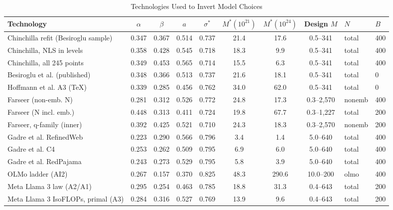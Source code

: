\begin{table}[htbp]
\centering
\small
\begin{threeparttable}
\caption{Technologies Used to Invert Model Choices}
\label{tab:m3_technologies}
\begin{tabular}{@{}lcccccccll@{}}
\toprule
Technology & $\alpha$ & $\beta$ & $a$ & $\sigma^*$ & $M^*(10^{21})$ & $M^*(10^{24})$ & Design $M$ & $N$ & $B$ \\
\midrule
Chinchilla refit (Besiroglu sample) & 0.347 & 0.367 & 0.514 & 0.737 & 21.4 & 17.6 & 0.5--341 & total & 400 \\
Chinchilla, NLS in levels & 0.358 & 0.428 & 0.545 & 0.718 & 18.3 & 9.9 & 0.5--341 & total & 400 \\
Chinchilla, all 245 points & 0.349 & 0.453 & 0.565 & 0.714 & 15.5 & 6.3 & 0.5--341 & total & 400 \\
Besiroglu et al. (published) & 0.348 & 0.366 & 0.513 & 0.737 & 21.6 & 18.1 & 0.5--341 & total & 0 \\
Hoffmann et al. A3 (TeX) & 0.339 & 0.285 & 0.456 & 0.762 & 34.0 & 62.0 & 0.5--341 & total & 0 \\
Farseer (non-emb. N) & 0.281 & 0.312 & 0.526 & 0.772 & 24.8 & 17.3 & 0.3--2,570 & nonemb & 400 \\
Farseer (N incl. emb.) & 0.448 & 0.313 & 0.411 & 0.724 & 19.8 & 67.7 & 0.3--1,227 & total & 200 \\
Farseer, q-family (inner) & 0.392 & 0.425 & 0.521 & 0.710 & 24.3 & 18.3 & 0.3--2,570 & nonemb & 200 \\
Gadre et al. RefinedWeb & 0.223 & 0.290 & 0.566 & 0.796 & 3.4 & 1.4 & 5.0--640 & total & 400 \\
Gadre et al. C4 & 0.253 & 0.262 & 0.509 & 0.795 & 6.9 & 6.0 & 5.0--640 & total & 400 \\
Gadre et al. RedPajama & 0.243 & 0.273 & 0.529 & 0.795 & 5.8 & 3.9 & 5.0--640 & total & 400 \\
OLMo ladder (AI2) & 0.267 & 0.157 & 0.370 & 0.825 & 48.3 & 290.6 & 10.0--200 & olmo & 400 \\
Meta Llama 3 law (A2/A1) & 0.295 & 0.254 & 0.463 & 0.785 & 18.8 & 31.3 & 0.4--643 & total & 200 \\
Meta Llama 3 IsoFLOPs, primal (A3) & 0.284 & 0.316 & 0.527 & 0.769 & 13.9 & 9.6 & 0.4--643 & total & 200 \\
\bottomrule
\end{tabular}
\begin{tablenotes}\footnotesize

\end{tablenotes}
\end{threeparttable}
\end{table}
